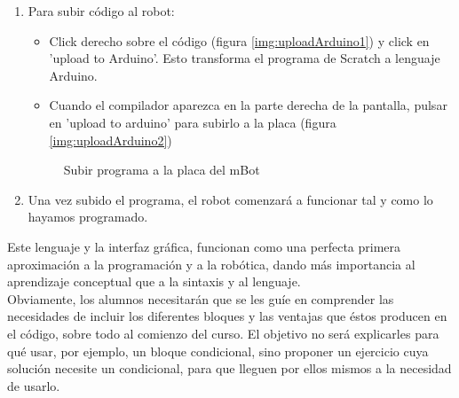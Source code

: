 \begin{enumerate}
	\item Para subir código al robot:
		\begin{itemize}
			\item Click derecho sobre el código (figura \ref{img:uploadArduino1}) y click en 'upload to Arduino'. Esto transforma el programa de Scratch a lenguaje Arduino.
			\item Cuando el compilador aparezca en la parte derecha de la pantalla, pulsar en 'upload to arduino' para subirlo a la placa (figura \ref{img:uploadArduino2})
		\end{itemize}
	\begin{figure}[H]
		\centering
		\begin{subfigure}
			[Compilar programa]{
				\texttt{[image: mblock4.png]}
				\label{img:uploadArduino1}}
		\end{subfigure}
		\begin{subfigure}
			[Subir programa a la placa]{
				\texttt{[image: mblock5.png]}
				\label{img:uploadArduino2}}
		\end{subfigure}
	\caption{Subir programa a la placa del mBot}
	\label{img:uploadArduino}
	\end{figure}

	\item Una vez subido el programa, el robot comenzará a funcionar tal y como lo hayamos programado.
\end{enumerate}
 

\par Este lenguaje y la interfaz gráfica, funcionan como una perfecta primera aproximación a la programación y a la robótica, dando más importancia al aprendizaje conceptual que a la sintaxis y al lenguaje. \\
Obviamente, los alumnos necesitarán que se les guíe en comprender las necesidades de incluir los diferentes bloques y las ventajas que éstos producen en el código, sobre todo al comienzo del curso. El objetivo no será explicarles para qué usar, por ejemplo, un bloque condicional, sino proponer un ejercicio cuya solución necesite un condicional, para que lleguen por ellos mismos a la necesidad de usarlo.
